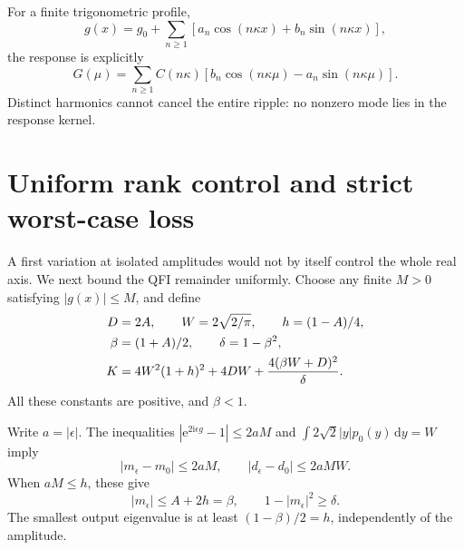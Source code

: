 \documentclass[aps,pra,reprint,amsmath,amssymb,nofootinbib,floatfix]{revtex4-2}
\newcommand{\dd}{\mathrm{d}}
\newcommand{\ii}{\mathrm{i}}
\newcommand{\ee}{\mathrm{e}}
\begin{document}
For a finite trigonometric profile,
\begin{equation}
g(x)=g_0+\sum_{n\geq1}[a_n\cos(n\kappa x)+b_n\sin(n\kappa x)],
\end{equation}
the response is explicitly
\begin{equation}
 G(\mu)=\sum_{n\geq1}C(n\kappa)
 [b_n\cos(n\kappa\mu)-a_n\sin(n\kappa\mu)].
 \label{eq:trigresponse}
\end{equation}
Distinct harmonics cannot cancel the entire ripple: no nonzero mode lies
in the response kernel.

\section{Uniform rank control and strict worst-case loss}

A first variation at isolated amplitudes would not by itself control the
whole real axis. We next bound the QFI remainder uniformly. Choose any
finite $M>0$ satisfying $|g(x)|\leq M$, and define
\begin{align}
 D&=2A,\qquad W=2\sqrt{2/\pi},\qquad h=(1-A)/4,\notag\\
 \beta&=(1+A)/2,\qquad \delta=1-\beta^2,\notag\\
 K&=4W^2(1+h)^2+4DW+
 \frac{4(\beta W+D)^2}{\delta}.
 \label{eq:constants}
\end{align}
All these constants are positive, and $\beta<1$.

Write $a=|\epsilon|$. The inequalities
$|\ee^{2\ii\epsilon g}-1|\leq2aM$ and
$\int 2\sqrt2|y|p_0(y)\,\dd y=W$ imply
\begin{equation}
 |m_\epsilon-m_0|\leq2aM,\qquad
 |d_\epsilon-d_0|\leq2aMW.
 \label{eq:lipschitz}
\end{equation}
When $aM\leq h$, these give
\begin{equation}
 |m_\epsilon|\leq A+2h=\beta,
 \qquad 1-|m_\epsilon|^2\geq\delta.
 \label{eq:rank}
\end{equation}
The smallest output eigenvalue is at least $(1-\beta)/2=h$,
independently of the amplitude.
\end{document}
